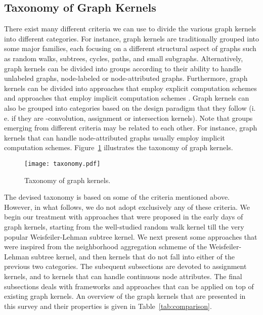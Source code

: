 \documentclass[twoside,11pt]{article}
\newcommand{\ie}{i.\,e. }
\begin{document}
\subsection{Taxonomy of Graph Kernels}
There exist many different criteria we can use to divide the various graph kernels into different categories.
For instance, graph kernels are traditionally grouped into some major families, each focusing on a different structural aspect of graphs such as random walks, subtrees, cycles, paths, and small subgraphs.
Alternatively, graph kernels can be divided into groups according to their ability to handle unlabeled graphs, node-labeled or node-attributed graphs.
Furthermore, graph kernels can be divided into approaches that employ explicit computation schemes and approaches that employ implicit computation schemes \cite{kriege2014explicit}.
Graph kernels can also be grouped into categories based on the design paradigm that they follow (\ie if they are -convolution, assignment or intersection kernels).
Note that groups emerging from different criteria may be related to each other.
For instance, graph kernels that can handle node-attributed graphs usually employ implicit computation schemes.
Figure~\ref{fig:taxonomy} illustrates the taxonomy of graph kernels.
\begin{figure}[t]
    \centering
    \texttt{[image: taxonomy.pdf]}
    \caption{Taxonomy of graph kernels.}
    \label{fig:taxonomy}
\end{figure}
The devised taxonomy is based on some of the criteria mentioned above. 
However, in what follows, we do not adopt exclusively any of these criteria.
We begin our treatment with approaches that were proposed in the early days of graph kernels, starting from the well-studied random walk kernel till the very popular Weisfeiler-Lehman subtree kernel.
We next present some approaches that were inspired from the neighborhood aggregation schmeme of the Weisfeiler-Lehman subtree kernel, and then kernels that do not fall into either of the previous two categories.
The subequent subsections are devoted to assignment kernels, and to kernels that can handle continuous node attributes.
The final subsections deals with frameworks and approaches that can be applied on top of existing graph kernels.
An overview of the graph kernels that are presented in this survey and their properties is given in Table~\ref{tab:comparison}.
\end{document}
